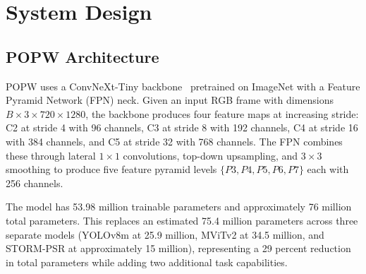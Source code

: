 \documentclass[10pt,twocolumn]{article}
\newcommand{\popw}{POPW}
\begin{document}
\section{System Design}
\label{sec:system}

\subsection{\popw{} Architecture}

\popw{} uses a ConvNeXt-Tiny backbone~\cite{liu2022convnet} pretrained on ImageNet with a Feature Pyramid Network (FPN) neck. Given an input RGB frame with dimensions \(B \times 3 \times 720 \times 1280\), the backbone produces four feature maps at increasing stride: C2 at stride 4 with 96 channels, C3 at stride 8 with 192 channels, C4 at stride 16 with 384 channels, and C5 at stride 32 with 768 channels. The FPN combines these through lateral \(1 \times 1\) convolutions, top-down upsampling, and \(3 \times 3\) smoothing to produce five feature pyramid levels \(\{P3, P4, P5, P6, P7\}\) each with 256 channels.

The model has 53.98 million trainable parameters and approximately 76 million total parameters. This replaces an estimated 75.4 million parameters across three separate models (YOLOv8m at 25.9 million, MViTv2 at 34.5 million, and STORM-PSR at approximately 15 million), representing a 29 percent reduction in total parameters while adding two additional task capabilities.
\end{document}
